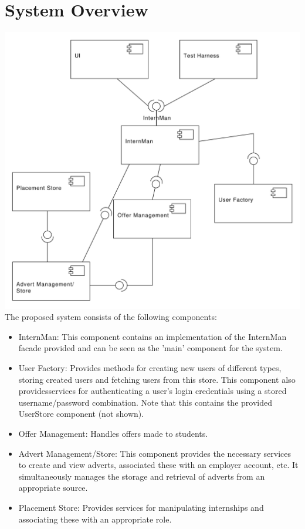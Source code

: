 \documentclass{l3deliverable}
\begin{document}
\section{System Overview}
\includegraphics[scale = 0.4]{ComponentDiagram.pdf}\\
The proposed system consists of the following components:
\begin{itemize}
\item{InternMan: This component contains an implementation of the InternMan facade provided and can be seen as the 'main' component for the system. }
\item{User Factory: Provides methods for creating new users of different types, storing created users and fetching users from this store. This component also providesservices for authenticating a user's login credentials using a stored username/password combination. Note that this contains the provided UserStore component (not shown).}
\item{Offer Management: Handles offers made to students.}
\item{Advert Management/Store: This component provides the necessary services to create and view adverts, associated these with an employer account, etc. It simultaneously
manages the storage and retrieval of adverts from an appropriate source.}
\item{Placement Store: Provides services for manipulating internships and associating these with an appropriate role.}
\end{itemize}
\end{document}
